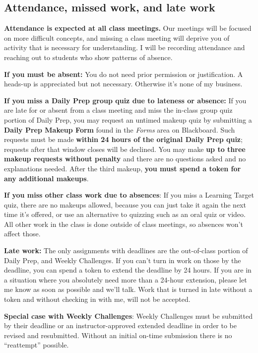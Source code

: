 \documentclass[]{article}
\begin{document}
\subsection{Attendance, missed work, and late work}

\textbf{Attendance is expected at all class meetings.} Our meetings will be focused on more difficult concepts, and missing a class meeting will deprive you of activity that is necessary for understanding. I will be recording attendance and reaching out to students who show patterns of absence. 

\textbf{If you must be absent:} You do not need prior permission or justification. A heads-up is appreciated but not necessary. Otherwise it's none of my business.

\textbf{If you miss a Daily Prep group quiz due to lateness or absence:} If you are late for or absent from a class meeting and miss the in-class group quiz portion of Daily Prep, you may request an untimed makeup quiz by submitting a \textbf{Daily Prep Makeup Form} found in the \textit{Forms} area on Blackboard. Such requests must be made \textbf{within 24 hours of the original Daily Prep quiz}; requests after that window closes will be declined. You may make \textbf{up to three makeup requests without penalty} and there are no questions asked and no explanations needed. After the third makeup, \textbf{you must spend a token for any additional makeups}. 

\textbf{If you miss other class work due to absences}: If you miss a Learning Target quiz, there are no makeups allowed, because you can just take it again the next time it's offered, or use an alternative to quizzing such as an oral quiz or video. All other work in the class is done outside of class meetings, so absences won't affect those. 

\textbf{Late work:} The only assignments with deadlines are the out-of-class portion of Daily Prep, and Weekly Challenges. If you can't turn in work on those by the deadline, you can spend a token to extend the deadline by 24 hours. If you are in a situation where you absolutely need more than a 24-hour extension, please let me know as soon as possible and we'll talk. Work that is turned in late without a token and without checking in with me, will not be accepted. 

\textbf{Special case with Weekly Challenges}: Weekly Challenges must be submitted by their deadline or an instructor-approved extended deadline in order to be revised and resubmitted. Without an initial on-time submission there is no ``reattempt'' possible. 
\end{document}
